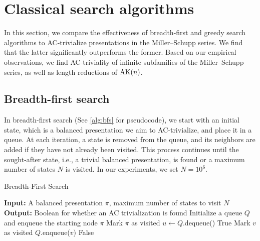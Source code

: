 
\section{Classical search algorithms}\label{sec:search}

In this section, we compare the effectiveness of breadth-first and greedy search algorithms to AC-trivialize presentations in the Miller--Schupp series.
We find that the latter significantly outperforms the former. Based on our empirical observations, we find AC-triviality of infinite subfamilies of the Miller--Schupp series, as well as length reductions of $\text{AK}(n)$. 

\subsection{Breadth-first search}

In breadth-first search (See \cref{alg:bfs} for pseudocode), we start with an initial state, which is a balanced presentation we aim to AC-trivialize, and place it in a queue. At each iteration, a state is removed from the queue, and its neighbors are added if they have not already been visited. This process continues until the sought-after state, i.e., a trivial balanced presentation, is found or a maximum number of states $N$ is visited. In our experiments, we set $N = 10^6$.

\begin{algorithm}
	\caption{Breadth-First Search}\label{alg:bfs}
	\begin{algorithmic}[1] %
		\State \textbf{Input:} A balanced presentation $\pi$, maximum number of states to visit $N$
		\State \textbf{Output:} Boolean for whether an AC trivialization is found
		\State Initialize a queue $Q$ and enqueue the starting node $\pi$
		\State Mark $\pi$ as visited
		\State $u \gets Q$.dequeue() 
		\State \Return True 
		\EndIf
		\State Mark $v$ as visited
		\State $Q$.enqueue($v$) 
		\EndIf
		\EndFor
		\EndWhile
		\State \Return False 
	\end{algorithmic}
\end{algorithm}

